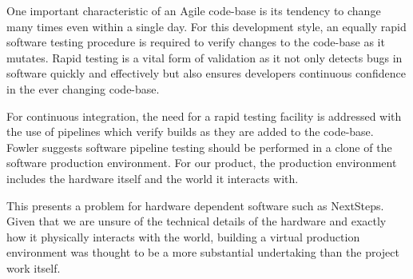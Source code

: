 \documentclass{l3proj}
\begin{document}
One important characteristic of an Agile code-base is its tendency to change many times even within a single day.
 For this development style, an equally rapid software testing procedure is required to verify changes to the code-base as it mutates. 
 Rapid testing is a vital form of validation as it not only detects bugs in software quickly and effectively but also ensures developers continuous confidence in the ever changing code-base.

For continuous integration, the need for a rapid testing facility is addressed with the use of pipelines which verify builds as they are added to the code-base\cite{fowler1}. 
Fowler suggests software pipeline testing should be performed in a clone of the software production environment\cite{fowler2}. For our product, the production environment includes the hardware itself and the world it interacts with.

This presents a problem for hardware dependent software such as NextSteps. Given that we are unsure of the technical details of the hardware and exactly how it physically interacts with the world, building a virtual production environment was thought to be a more substantial undertaking than the project work itself. 
\end{document}
